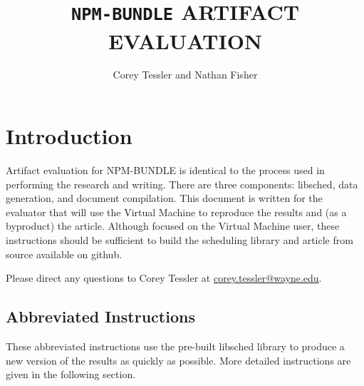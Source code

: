 \documentclass[a4paper]{article}
\newcommand{\npmbundle}{\texttt{NPM-BUNDLE}}
\begin{document}
\title{\npmbundle{} ARTIFACT EVALUATION}
\author{Corey Tessler and Nathan Fisher}
\maketitle

\section{Introduction}

Artifact evaluation for NPM-BUNDLE is identical to the process used in
performing the research and writing. There are three components:
libsched, data generation, and document compilation. This document is
written for the evaluator that will use the Virtual Machine to
reproduce the results and (as a byproduct) the article. Although
focused on the Virtual Machine user, these instructions should be
sufficient to build the scheduling library and article from source
available on github.

Please direct any questions to Corey Tessler at \href{mailto:corey.tessler@wayne.edu}{corey.tessler@wayne.edu}.

\subsection{Abbreviated Instructions}

These abbreviated instructions use the pre-built libsched library to
produce a new version of the results as quickly as possible. More
detailed instructions are given in the following section.
\end{document}
